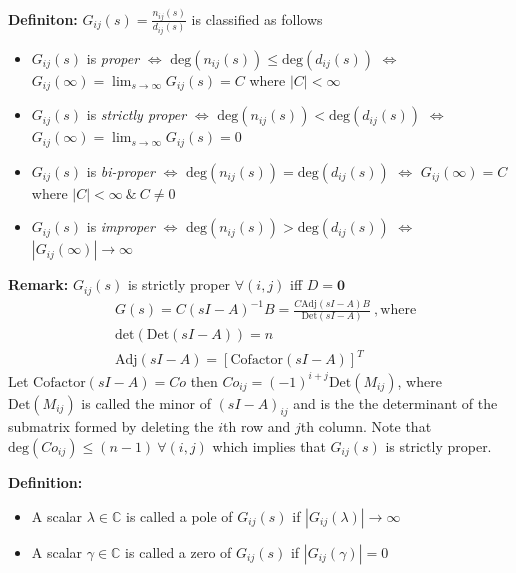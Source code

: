 \documentclass[twoside]{article}
\begin{document}
\textbf{Definiton:} $G_{ij}(s) = \frac{n_{ij}(s)}{d_{ij}(s)}$ is
classified as follows
%
\begin{itemize}
  \item $G_{ij}(s)$ is \textit{proper} $\Leftrightarrow$
    $\mathrm{deg}( n_{ij}(s) ) \leq \mathrm{deg}( d_{ij}(s) )$
    $\Leftrightarrow$ $G_{ij}(\infty) = \lim_{s \to \infty} G_{ij}(s)
    = C $ where $|C| < \infty$
  \item $G_{ij}(s)$ is \textit{strictly proper} $\Leftrightarrow$
    $\mathrm{deg}( n_{ij}(s) ) < \mathrm{deg}( d_{ij}(s) )$
    $\Leftrightarrow$ $G_{ij}(\infty) = \lim_{s \to \infty} G_{ij}(s)
    = 0 $ 
  \item $G_{ij}(s)$ is \textit{bi-proper} $\Leftrightarrow$
    $\mathrm{deg}( n_{ij}(s) ) = \mathrm{deg}( d_{ij}(s) )$
    $\Leftrightarrow$ $G_{ij}(\infty) 
    = C $ where $| C | < \infty \ \& \ C \neq 0$ 
  \item $G_{ij}(s)$ is \textit{improper} $\Leftrightarrow$
    $\mathrm{deg}( n_{ij}(s) ) > \mathrm{deg}( d_{ij}(s) )$
    $\Leftrightarrow $ $ | G_{ij}(\infty) | \to \infty $ 
\end{itemize}

\textbf{Remark:} $G_{ij}(s)$ is strictly proper $\forall (i,j)$ iff
$D = \mathbf{0}$
%
\begin{align*}
&G(s) = C \left( s I - A \right)^{-1} B =\frac{ C \mathrm{Adj}\left( s
       I - A \right) B}{ \mathrm{Det}\left( s
       I - A \right) } \ , \mathrm{where}
\\
&\mathrm{det} \left( \mathrm{Det}\left( s I - A \right) \right) = n
\\
&\mathrm{Adj}\left( s I - A \right) = \left[ \mathrm{Cofactor}\left(
  s I - A \right) \right]^T
\end{align*}
%
Let $ \mathrm{Cofactor}\left(
  s I - A \right) = Co$ then $Co_{ij} = (-1)^{i+j} \mathrm{Det}\left( M_{ij}
  \right)$, where $\mathrm{Det}\left( M_{ij} \right)$ is called the
  minor of $\left( s I - A \right)_{ij}$ and is the the determinant of
  the submatrix formed by deleting the $i$th row and $j$th column.
  Note that $\mathrm{deg}(Co_{ij}) \leq (n-1) \ \forall (i,j)$ which
  implies that $G_{ij}(s)$ is strictly proper.

\vspace{6pt}

\textbf{Definition:} 
\vspace{-6pt}
\begin{itemize}
\item A scalar $\lambda \in \mathbb{C}$ is called a pole of $G_{ij}(s)$ if $
| G_{ij}(\lambda) | \to \infty $
\item A scalar $\gamma \in \mathbb{C}$ is called a zero of $G_{ij}(s)$ if $
| G_{ij}(\gamma) | = 0 $
\end{itemize}
\end{document}
